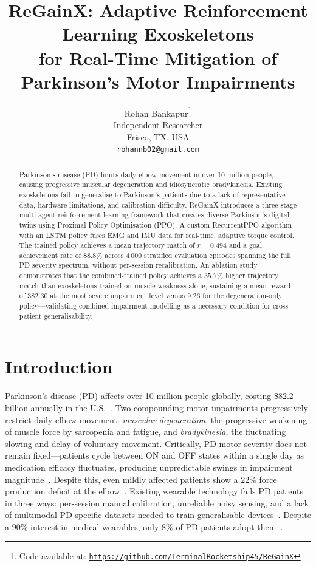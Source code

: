 \documentclass{article}
\title{ReGainX: Adaptive Reinforcement Learning Exoskeletons\\
for Real-Time Mitigation of Parkinson's Motor Impairments}
\author{%
  Rohan Bankapur\thanks{Code available at: \href{https://github.com/TerminalRocketship45/ReGainX}{\texttt{https://github.com/TerminalRocketship45/ReGainX}}} \\
  Independent Researcher \\
  Frisco, TX, USA \\
  \texttt{rohannb02@gmail.com}
}
\begin{document}
\maketitle

\begin{abstract}
Parkinson's disease (PD) limits daily elbow movement in over 10 million
people, causing progressive muscular degeneration and idiosyncratic
bradykinesia. Existing exoskeletons fail to generalise to Parkinson's
patients due to a lack of representative data, hardware limitations, and
calibration difficulty. ReGainX introduces a three-stage multi-agent
reinforcement learning framework that creates diverse Parkinson's digital
twins using Proximal Policy Optimisation (PPO). A custom RecurrentPPO
algorithm with an LSTM policy fuses EMG and IMU data for real-time,
adaptive torque control. The trained policy achieves a mean trajectory
match of $r{=}0.494$ and a goal achievement rate of $88.8\%$ across
4\,000 stratified evaluation episodes spanning the full PD severity
spectrum, without per-session recalibration. An ablation study demonstrates that the combined-trained policy achieves
a $35.7\%$ higher trajectory match than exoskeletons trained on muscle
weakness alone, sustaining a mean reward of $382.30$ at the most severe
impairment level versus $9.26$ for the degeneration-only
policy---validating combined impairment modelling as a necessary
condition for cross-patient generalisability.
\end{abstract}


\section{Introduction}
\label{sec:intro}

Parkinson's disease (PD) affects over 10 million people globally, costing
\$82.2 billion annually in the U.S.~\citep{chaudhuri2025, parkinson2026}.
Two compounding motor impairments progressively restrict daily elbow
movement: \emph{muscular degeneration}, the progressive weakening of
muscle force by sarcopenia and fatigue, and \emph{bradykinesia}, the
fluctuating slowing and delay of voluntary movement. Critically, PD motor
severity does not remain fixed---patients cycle between ON and OFF states
within a single day as medication efficacy fluctuates, producing
unpredictable swings in impairment magnitude~\citep{ramesh2022}. Despite
this, even mildly affected patients show a $22\%$ force production deficit
at the elbow~\citep{ingram2021}. Existing wearable technology fails PD
patients in three ways: per-session manual calibration, unreliable noisy
sensing, and a lack of multimodal PD-specific datasets needed to train
generalisable devices~\citep{researchgate2023, arxiv2025}. Despite a
$90\%$ interest in medical wearables, only $8\%$ of PD patients adopt
them~\citep{hirczy2024}.
\end{document}

